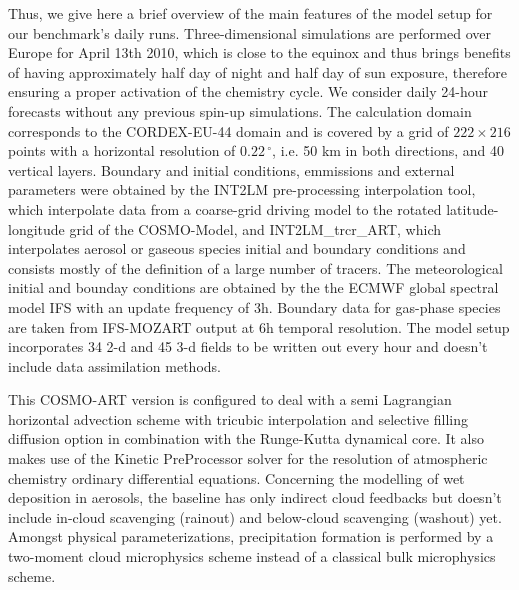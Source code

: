 Thus, we give here a brief  overview of the main features of the model
setup for  our benchmark's daily  runs.  Three-dimensional simulations
are performed over  Europe for April 13th 2010, which  is close to the
equinox and thus  brings benefits of having approximately  half day of
night  and half  day  of  sun exposure,  therefore  ensuring a  proper
activation of the chemistry cycle. We consider daily 24-hour forecasts
without  any  previous spin-up  simulations.   The calculation  domain
corresponds to  the CORDEX-EU-44  domain and is  covered by a  grid of
$222\times   216$    points   with   a    horizontal   resolution   of
$0.22\,^{\circ}$,  i.e.  50  km in  both directions,  and  40 vertical
layers.   Boundary  and initial  conditions,  emmissions and  external
parameters  were obtained by  the INT2LM  pre-processing interpolation
tool, which interpolate  data from a coarse-grid driving  model to the
rotated    latitude-longitude   grid    of   the    COSMO-Model,   and
INT2LM\_trcr\_ART,  which  interpolates  aerosol  or  gaseous  species
initial and boundary conditions  and consists mostly of the definition
of a large number of  tracers.  The meteorological initial and bounday
conditions are  obtained by  the the ECMWF  global spectral  model IFS
with an update  frequency of 3h.  Boundary data  for gas-phase species
are taken from IFS-MOZART output at 6h temporal resolution.  The model
setup incorporates  34 2-d and 45  3-d fields to be  written out every
hour and doesn't include data assimilation methods.

This COSMO-ART  version is configured  to deal with a  semi Lagrangian
horizontal advection scheme  with tricubic interpolation and selective
filling diffusion option in combination with the Runge-Kutta dynamical
core. It  also makes  use of the  Kinetic PreProcessor solver  for the
resolution of  atmospheric chemistry ordinary  differential equations.
Concerning the  modelling of wet deposition in  aerosols, the baseline
has  only  indirect  cloud  feedbacks  but  doesn't  include  in-cloud
scavenging  (rainout)   and  below-cloud  scavenging   (washout)  yet.
Amongst   physical  parameterizations,   precipitation   formation  is
performed  by a  two-moment  cloud microphysics  scheme  instead of  a
classical  bulk microphysics  scheme.
